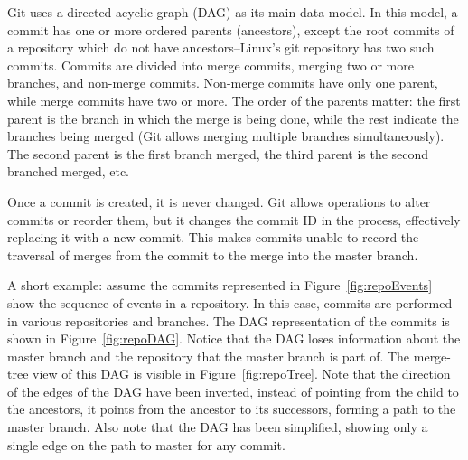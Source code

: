 Git uses a directed acyclic graph (DAG) as its main data model. In this
model, a commit has one or more ordered parents (ancestors), except the
root commits of a repository which do not have ancestors--Linux's git
repository has two such commits.  Commits are divided into merge
commits, merging two or more branches, and non-merge commits. Non-merge
commits have only one parent, while merge commits have two or more. The
order of the parents matter: the first parent is the branch in which the
merge is being done, while the rest indicate the branches being merged
(Git allows merging multiple branches simultaneously). The second parent
is the first branch merged, the third parent is the second branched
merged, etc.

Once a commit is created, it is never changed. Git allows operations to
alter commits or reorder them, but it changes the commit ID in the
process, effectively replacing it with a new commit. This makes commits
unable to record the traversal of merges from the commit to the merge
into the master branch.

A short example: assume the commits represented in
Figure~\ref{fig:repoEvents} show the sequence of events in a repository.
In this case, commits are performed in various repositories and
branches. The DAG representation of the commits is shown in
Figure~\ref{fig:repoDAG}. Notice that the DAG loses information about
the master branch and the repository that the master branch is part of.
The merge-tree view of this DAG is visible in Figure~\ref{fig:repoTree}.
Note that the direction of the edges of the DAG have been inverted,
instead of pointing from the child to the ancestors, it points from the
ancestor to its successors, forming a path to the master branch. Also
note that the DAG has been simplified, showing only a single edge on the
path to master for any commit.

